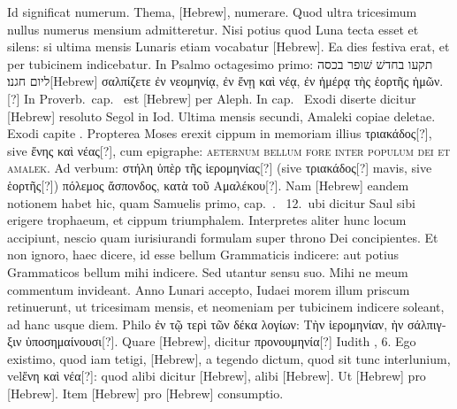 Id significat numerum.
Thema, \texthebrew{}[Hebrew], numerare.
Quod ultra tricesimum nullus numerus mensium admitteretur.
Nisi
potius quod Luna tecta esset et silens: si ultima mensis Lunaris etiam
vocabatur \texthebrew{}[Hebrew].
Ea dies festiva erat, et per tubicinem indicebatur.
In
Psalmo octagesimo primo: %
 \texthebrew{תקעו בחדשׁ שׁופר בכסה ליום חגנו׃}[Hebrew]
 \textgreek{σαλπίζετε ἐν
νεομηνίᾳ, ἐν ἔνῃ καὶ νέᾳ, ἐν ἡμέρᾳ τὴς ἑορτῆς ἡμῶν.}[?]
In Proverb.\ cap.\  est %
\texthebrew{}[Hebrew] per Aleph.
In cap.\  Exodi diserte dicitur %
 \texthebrew{}[Hebrew] resoluto
Segol in Iod.
Ultima mensis secundi, Amaleki copiae deletae.
Exodi capite .
Propterea Moses erexit cippum in memoriam
illius \textgreek{τριακάδος}[?], sive \textgreek{ἔνης καὶ νέας}[?],
 cum epigraphe: \textsc{aeternum
bellum fore inter populum dei et
amalek}.
Ad verbum: \textgreek{στήλη ὑπὲρ τῆς ἱερομηνίας}[?]
 (sive \textgreek{τριακάδος}[?] mavis, sive \textgreek{ἑορτῆς}[?])
 \textgreek{πόλεμος ἄσπονδος, κατὰ τοῦ Αμαλέκου}[?].
Nam
\texthebrew{}[Hebrew] eandem notionem habet hic, quam Samuelis primo,
 cap.\ .\ %
12.\ ubi dicitur Saul sibi erigere trophaeum, et cippum triumphalem.
Interpretes aliter hunc locum accipiunt, nescio quam iurisiurandi
formulam super throno Dei concipientes.
Et non ignoro,
haec dicere, id esse bellum Grammaticis indicere: aut potius Grammaticos
bellum mihi indicere.
Sed utantur sensu suo.
Mihi ne meum
commentum invideant.
Anno Lunari accepto, Iudaei morem illum
priscum retinuerunt, ut tricesimam mensis, et neomeniam
per tubicinem indicere soleant, ad hanc usque diem.
Philo \textgreek{ἐν τῷ τερὶ
τῶν δέκα λογίων: Τὴν ἱερομηνίαν, ὴν σάλπιγξιν ὑποσημαίνουσι}[?].
Quare \texthebrew{}[Hebrew], dicitur \textgreek{προνουμηνία}[?]
 Iudith , 6.
Ego existimo, quod iam
tetigi, \texthebrew{}[Hebrew], a tegendo dictum, quod sit tunc interlunium,
 vel\textgreek{ἔνη
καὶ νέα}[?]: quod alibi dicitur \texthebrew{}[Hebrew],
 alibi \texthebrew{}[Hebrew].
Ut \texthebrew{}[Hebrew] pro \texthebrew{}[Hebrew].
Item
\texthebrew{}[Hebrew] pro \texthebrew{}[Hebrew] consumptio.
